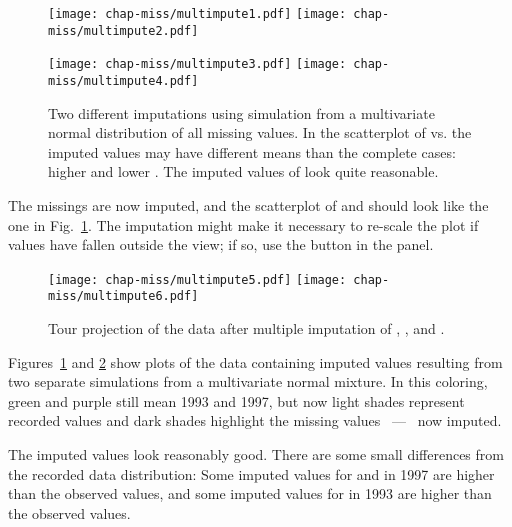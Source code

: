 \begin{figure}[htbp]
\centerline{
  {\texttt{[image: chap-miss/multimpute1.pdf]}}
  {\texttt{[image: chap-miss/multimpute2.pdf]}}
}
\centerline{
  {\texttt{[image: chap-miss/multimpute3.pdf]}}
  {\texttt{[image: chap-miss/multimpute4.pdf]}}
}
\caption[Two different imputations using simulation from a
multivariate normal distribution of all missing values]{Two different
imputations using simulation from a multivariate normal distribution
of all missing values.  In the scatterplot of  vs.
 the imputed values may have different means
than the complete cases: higher  and lower
.  The imputed values of  look quite
reasonable.  }
\label{multimp}
\end{figure}

\noindent The missings are now imputed, and the scatterplot of  and  should look like the
one in Fig.~\ref{multimp}. The imputation might make it necessary to
re-scale the plot if values have fallen outside the view; if so, 
use the  button in the  panel.

\begin{figure}[htbp]
\centerline{{\texttt{[image: chap-miss/multimpute5.pdf]}}
  {\texttt{[image: chap-miss/multimpute6.pdf]}}}
\caption[Tour projection of the data after multiple imputation]{Tour
projection of the data after multiple imputation of , , and .}
\label{multimp-tour}
\end{figure}

\noindent Figures~\ref{multimp} and \ref{multimp-tour} show plots of 
the data containing
imputed values resulting from two separate simulations from a
multivariate normal mixture.  In this coloring, green and purple still
mean 1993 and 1997, but now light shades represent recorded values and
dark shades highlight the missing values ~---~ now imputed.

The imputed values look reasonably good. There are some small
differences from the recorded data distribution: Some imputed values
for  and  in 1997
are higher than the observed values, and some imputed values for
 in 1993 are higher than the observed values.



